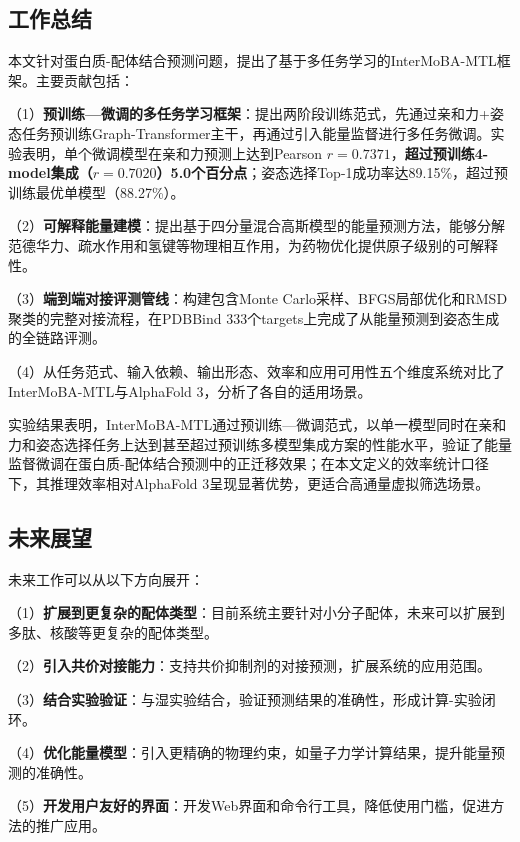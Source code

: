 \subsection{工作总结}

本文针对蛋白质-配体结合预测问题，提出了基于多任务学习的InterMoBA-MTL框架。主要贡献包括：

（1）\textbf{预训练—微调的多任务学习框架}：提出两阶段训练范式，先通过亲和力+姿态任务预训练Graph-Transformer主干，再通过引入能量监督进行多任务微调。实验表明，单个微调模型在亲和力预测上达到Pearson $r=0.7371$，\textbf{超过预训练4-model集成（$r=0.7020$）5.0个百分点}；姿态选择Top-1成功率达89.15\%，超过预训练最优单模型（88.27\%）。

（2）\textbf{可解释能量建模}：提出基于四分量混合高斯模型的能量预测方法，能够分解范德华力、疏水作用和氢键等物理相互作用，为药物优化提供原子级别的可解释性。

（3）\textbf{端到端对接评测管线}：构建包含Monte Carlo采样、BFGS局部优化和RMSD聚类的完整对接流程，在PDBBind 333个targets上完成了从能量预测到姿态生成的全链路评测。

（4）从任务范式、输入依赖、输出形态、效率和应用可用性五个维度系统对比了InterMoBA-MTL与AlphaFold 3，分析了各自的适用场景。

实验结果表明，InterMoBA-MTL通过预训练—微调范式，以单一模型同时在亲和力和姿态选择任务上达到甚至超过预训练多模型集成方案的性能水平，验证了能量监督微调在蛋白质-配体结合预测中的正迁移效果；在本文定义的效率统计口径下，其推理效率相对AlphaFold 3呈现显著优势，更适合高通量虚拟筛选场景。

\subsection{未来展望}

未来工作可以从以下方向展开：

（1）\textbf{扩展到更复杂的配体类型}：目前系统主要针对小分子配体，未来可以扩展到多肽、核酸等更复杂的配体类型。

（2）\textbf{引入共价对接能力}：支持共价抑制剂的对接预测，扩展系统的应用范围。

（3）\textbf{结合实验验证}：与湿实验结合，验证预测结果的准确性，形成计算-实验闭环。

（4）\textbf{优化能量模型}：引入更精确的物理约束，如量子力学计算结果，提升能量预测的准确性。

（5）\textbf{开发用户友好的界面}：开发Web界面和命令行工具，降低使用门槛，促进方法的推广应用。

\newpage
